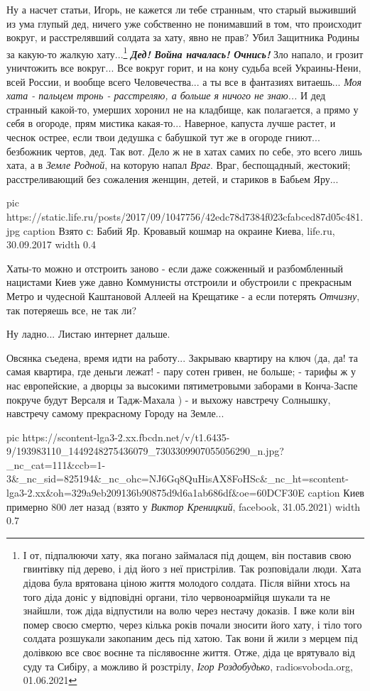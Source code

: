 Ну а насчет статьи, Игорь, не кажется ли тебе странным, что старый выживший из
ума глупый дед, ничего уже собственно не понимавший в том, что происходит
вокруг, и расстрелявший солдата за хату, явно не прав? Убил Защитника Родины за
какую-то жалкую хату...\footnote{
І от, підпалюючи хату, яка погано займалася під дощем, він поставив свою
гвинтівку під дерево, і дід його з неї пристрілив. Так розповідали люди. Хата
дідова була врятована ціною життя молодого солдата. Після війни хтось на того
діда доніс у відповідні органи, тіло червоноармійця шукали та не знайшли, тож
діда відпустили на волю через нестачу доказів. І вже коли він помер своєю
смертю, через кілька років почали зносити його хату, і тіло того солдата
розшукали закопаним десь під хатою. Так вони й жили з мерцем під долівкою все
своє воєнне та післявоєнне життя. Отже, діда це врятувало від суду та Сибіру, а
можливо й розстрілу, \emph{Ігор Роздобудько}, radiosvoboda.org, 01.06.2021} \textbf{\emph{Дед! Война
началась! Очнись!}} Зло напало, и грозит уничтожить все вокруг... Все вокруг
горит, и на кону судьба всей Украины-Нени, всей России, и вообще всего
Человечества...  а ты все в фантазиях витаешь... \emph{Моя хата - пальцем тронь
- расстреляю, а больше я ничого не знаю...} И дед странный какой-то, умерших
хоронил не на кладбище, как полагается, а прямо у себя в огороде, прям мистика
какая-то... Наверное, капуста лучше растет, и чеснок острее, если твои дедушка
с бабушкой тут же в огороде гниют...  безбожник чертов, дед. Так вот. Дело ж не
в хатах самих по себе, это всего лишь хата, а в \emph{Земле Родной}, на которую
напал \emph{Враг}. Враг, беспощадный, жестокий; расстреливающий без сожаления
женщин, детей, и стариков в Бабьем Яру...

\ifcmt
  pic https://static.life.ru/posts/2017/09/1047756/42edc78d7384f023cfabced87d05c481.jpg
  caption Взято с: Бабий Яр. Кровавый кошмар на окраине Киева, life.ru, 30.09.2017
  width 0.4
\fi

Хаты-то можно и отстроить заново - если даже сожженный и разбомбленный
нацистами Киев уже давно Коммунисты отстроили и обустроили с прекрасным Метро и
чудесной Каштановой Аллеей на Крещатике - а если потерять \emph{Отчизну}, так
потеряешь все, не так ли?

Ну ладно... Листаю интернет дальше. 

Овсянка съедена, время идти на работу... Закрываю квартиру на ключ (да, да! та самая квартира, где деньги
лежат! - пару сотен гривен, не больше; - тарифы ж у нас европейские, а дворцы
за высокими пятиметровыми заборами в Конча-Заспе покруче будут Версаля и
Тадж-Махала ) - и выхожу навстречу Солнышку, навстречу самому прекрасному
Городу на Земле... 

\ifcmt
  pic https://scontent-lga3-2.xx.fbcdn.net/v/t1.6435-9/193983110_1449248275436079_7303309907055056290_n.jpg?_nc_cat=111&ccb=1-3&_nc_sid=825194&_nc_ohc=NJ6Gq8QuHisAX8FoHSc&_nc_ht=scontent-lga3-2.xx&oh=329a9eb209136b90875d9d6a1ab686df&oe=60DCF30E
  caption Киев примерно 800 лет назад (взято у \emph{Виктор Креницкий}, facebook, 31.05.2021)
  width 0.7
\fi
